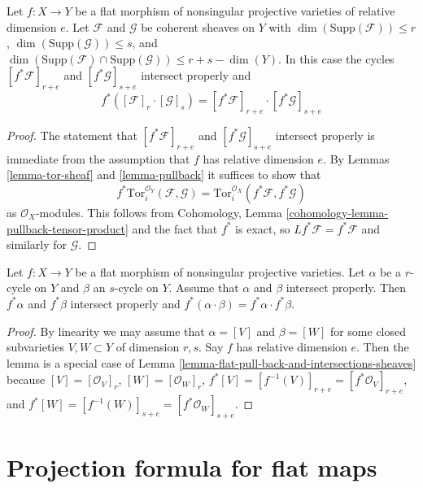\begin{lemma}
\label{lemma-flat-pull-back-and-intersections-sheaves}
Let $f : X \to Y$ be a flat morphism of nonsingular projective varieties
of relative dimension $e$. Let $\mathcal{F}$ and $\mathcal{G}$ be coherent
sheaves on $Y$ with $\dim(\text{Supp}(\mathcal{F})) \leq r$,
$\dim(\text{Supp}(\mathcal{G})) \leq s$, and
$\dim(\text{Supp}(\mathcal{F}) \cap \text{Supp}(\mathcal{G}) )
\leq r + s - \dim(Y)$. In this case the cycles
$[f^*\mathcal{F}]_{r + e}$ and $[f^*\mathcal{G}]_{s + e}$
intersect properly and
$$
f^*([\mathcal{F}]_r \cdot [\mathcal{G}]_s) =
[f^*\mathcal{F}]_{r + e} \cdot [f^*\mathcal{G}]_{s + e}
$$
\end{lemma}

\begin{proof}
The statement that $[f^*\mathcal{F}]_{r + e}$ and $[f^*\mathcal{G}]_{s + e}$
intersect properly is immediate from the assumption that $f$ has
relative dimension $e$. By
Lemmas \ref{lemma-tor-sheaf} and \ref{lemma-pullback}
it suffices to show that
$$
f^*\text{Tor}_i^{\mathcal{O}_Y}(\mathcal{F}, \mathcal{G}) =
\text{Tor}_i^{\mathcal{O}_X}(f^*\mathcal{F}, f^*\mathcal{G})
$$
as $\mathcal{O}_X$-modules. This follows from
Cohomology, Lemma \ref{cohomology-lemma-pullback-tensor-product}
and the fact that $f^*$ is exact, so $Lf^*\mathcal{F} = f^*\mathcal{F}$
and similarly for $\mathcal{G}$.
\end{proof}

\begin{lemma}
\label{lemma-flat-pullback-and-intersections}
Let $f : X \to Y$ be a flat morphism of nonsingular projective varieties.
Let $\alpha$ be a $r$-cycle on $Y$ and $\beta$ an $s$-cycle on $Y$.
Assume that $\alpha$ and $\beta$ intersect properly. Then $f^*\alpha$
and $f^*\beta$ intersect properly and
$f^*( \alpha \cdot \beta ) = f^*\alpha \cdot f^*\beta$.
\end{lemma}

\begin{proof}
By linearity we may assume that $\alpha = [V]$ and $\beta = [W]$
for some closed subvarieties $V, W \subset Y$ of dimension $r, s$.
Say $f$ has relative dimension $e$. Then the lemma is a special case of
Lemma \ref{lemma-flat-pull-back-and-intersections-sheaves}
because $[V] = [\mathcal{O}_V]_r$, $[W] = [\mathcal{O}_W]_r$,
$f^*[V] = [f^{-1}(V)]_{r + e} = [f^*\mathcal{O}_V]_{r + e}$, and
$f^*[W] = [f^{-1}(W)]_{s + e} = [f^*\mathcal{O}_W]_{s + e}$.
\end{proof}


\section{Projection formula for flat maps}
\label{section-projection-formula-flat}

